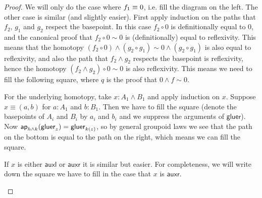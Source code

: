 \documentclass{article}
\renewcommand{\smash}{\wedge}
\newcommand{\tr}{\cdot}
\renewcommand{\o}{\ensuremath{\circ}}
\newcommand{\auxl}{\mathsf{auxl}}
\newcommand{\auxr}{\mathsf{auxr}}
\newcommand{\gluer}{\mathsf{gluer}}
\newcommand{\sy}{^{-1}}
\begin{document}
\begin{proof}
  We will only do the case where $f_1\equiv 0$, i.e. fill the diagram on the left. The other case is
  similar (and slightly easier). First apply induction on the paths that $f_2$, $g_1$ and $g_2$
  respect the basepoint. In this case $f_2\o0$ is definitionally equal to $0$, and the canonical
  proof that $f_2\o 0\sim0$ is (definitionally) equal to reflexivity. This means that the homotopy
  $(f_2 \o 0)\smash (g_2 \o g_1)\sim0\smash (g_2 \o g_1)$ is also equal to reflexivity, and also the
  path that $f_2 \smash g_2$ respects the basepoint is reflexivity, hence the homotopy
  $(f_2 \smash g_2)\o 0\sim0$ is also reflexivity. This means we need to fill the following square,
  where $q$ is the proof that $0\smash f\sim 0$.
\begin{center}
\end{center}

  For the underlying homotopy, take $x : A_1\smash B_1$ and apply induction on $x$. Suppose
  $x\equiv(a,b)$ for $a:A_1$ and $b:B_1$. Then we have to fill the square (denote the basepoints of
  $A_i$ and $B_i$ by $a_i$ and $b_i$ and we suppress the arguments of $\gluer$). Now
  $\mapfunc{h\smash k}(\gluer_z)=\gluer_{k(z)}$, so by general groupoid laws we see that the path on
  the bottom is equal to the path on the right, which means we can fill the square.
  \begin{center}
  \end{center}
  If $x$ is either $\auxl$ or $\auxr$ it is similar but easier. For completeness, we will write down the square we have to fill in the case that $x$ is $\auxr$.
  \begin{center}
  \end{center}
  

\end{proof}
\end{document}
